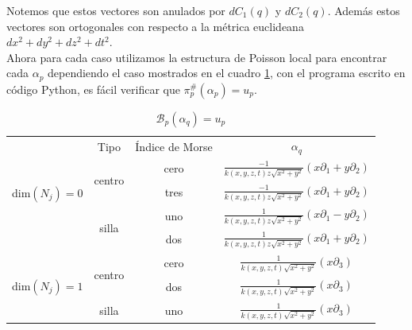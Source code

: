 \documentclass[a4paper,10pt]{book}
\begin{document}
Notemos que estos vectores son anulados por $dC_{1}(q)$ y $dC_{2}(q)$. Adem\'as estos vectores son ortogonales con respecto a la m\'etrica euclideana $dx^{2}+dy^{2}+dz^{2}+dt^{2}$.\\

Ahora para cada caso utilizamos la estructura de Poisson local para encontrar cada $\alpha_{p}$ dependiendo el caso mostrados en el cuadro \ref{tabla8}, con el programa escrito en c\'odigo Python, es f\'acil verificar que $\pi^{\#}_{p}(\alpha_{p})=u_{p}$.

\begin{table}[!ht]
\centering
\begin{tabular}{|c|c|c|c|}
\hline
\multirow{5}{*}{dim$(N_{j})=0$} & Tipo                    & \multicolumn{1}{l|}{\'Indice de Morse} & $\alpha_{q}$                                                                                                \\ \cline{2-4} 
                                & \multirow{2}{*}{centro} & cero                             & $\frac{-1}{k(x,y,z,t)z\sqrt{x^{2}+y^{2}}}(x\partial_{1}+y\partial_{2})$ \\ \cline{3-4} 
                                &                         & tres                            & $\frac{-1}{k(x,y,z,t)z\sqrt{x^{2}+y^{2}}}(x\partial_{1}+y\partial_{2})$ \\ \cline{2-4} 
                                & \multirow{2}{*}{silla} & uno                              & $\frac{1}{k(x,y,z,t)z\sqrt{x^{2}+y^{2}}}(x\partial_{1}-y\partial_{2})$  \\ \cline{3-4} 
                                &                         & dos                              & $\frac{1}{k(x,y,z,t)z\sqrt{x^{2}+y^{2}}}(x\partial_{1}+y\partial_{2})$  \\ \hline
\multirow{3}{*}{dim$(N_{j})=1$} & \multirow{2}{*}{centro} & cero                             & $\frac{1}{k(x,y,z,t)\sqrt{x^{2}+y^{2}}}(x\partial_{3})$                          \\ \cline{3-4} 
                                &                         & dos                              & $\frac{1}{k(x,y,z,t)\sqrt{x^{2}+y^{2}}}(x\partial_{3})$                          \\ \cline{2-4} 
                                & silla                  & uno                              & $\frac{1}{k(x,y,z,t)\sqrt{x^{2}+y^{2}}}(x\partial_{3})$                          \\ \hline
\end{tabular}
\caption{$\mathcal{B}_{p}(\alpha_{q})=u_{p}$}
\label{tabla8}
\end{table}
    
\end{document}

